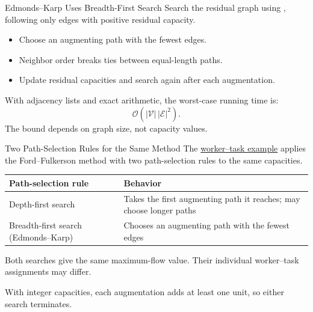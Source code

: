 \documentclass[aspectratio=169,11pt]{beamer}
\newcommand{\examplelink}{https://github.com/varnerlab/CHEME-5800-CourseRepository-Fall-2026/blob/main/weeks/week-05/L5a/CHEME-5800-L5a-WorkedExample-MaximumFlow-Fall-2026.ipynb}
\begin{document}
\begin{frame}{Edmonds–Karp Uses Breadth-First Search}
  Search the residual graph using , following
  only edges with positive residual capacity.

  \vspace{0.6em}
  \begin{itemize}\setlength{\itemsep}{0.6em}
    \item Choose an augmenting path with the fewest edges.
    \item Neighbor order breaks ties between equal-length paths.
    \item Update residual capacities and search again after each augmentation.
  \end{itemize}

  \vspace{0.4em}
  With adjacency lists and exact arithmetic, the worst-case running time is:
  \[
    \mathcal O\!\left(|\mathcal V|\,|\mathcal E|^2\right).
  \]
  The bound depends on graph size, not capacity values.

\end{frame}

\begin{frame}{Two Path-Selection Rules for the Same Method}
  The \href{\examplelink}{worker–task example} applies the Ford–Fulkerson
  method with two path-selection rules to the same capacities.

  \vspace{0.7em}
  \renewcommand{\arraystretch}{1.4}
  \begin{tabularx}{\textwidth}{YY}
    \toprule
    \textbf{Path-selection rule} & \textbf{Behavior}\\
    \midrule
    Depth-first search & Takes the first augmenting path it reaches; may choose longer paths\\
    Breadth-first search (Edmonds–Karp) & Chooses an augmenting path with the fewest edges\\
    \bottomrule
  \end{tabularx}

  \vspace{0.7em}
  Both searches give the same maximum-flow value. Their individual
  worker–task assignments may differ.

  \vspace{0.5em}
  With integer capacities, each augmentation adds at least one unit, so
  either search terminates.
\end{frame}
\end{document}
